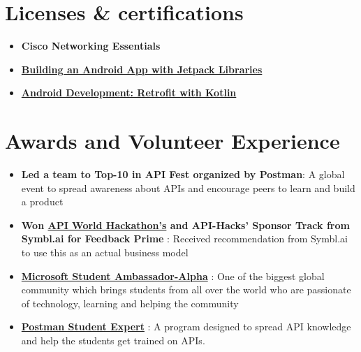 \documentclass[letterpaper,11pt]{article}
\newcommand{\resumeItem}[1]{
  \item\small{
    {#1 \vspace{-2pt}}
  }
}
\newcommand{\resumeItemListStart}{\begin{itemize}}
\newcommand{\resumeItemListEnd}{\end{itemize}\vspace{-5pt}}
\begin{document}
   
\section{Licenses \& certifications}
 \begin{itemize}[leftmargin=0.15in, label={}]
    \small{\item{
        \resumeItemListStart
                \resumeItem{\textbf{{Cisco Networking Essentials}}}
                \resumeItem{\textbf{\href{https://www.linkedin.com/learning/certificates/0678a1527860b8e6ba5694ca1c73c5bab5c3463b8bb5d6c3b9a1fcc19be38ce9}{Building an Android App with Jetpack Libraries}}}
                \resumeItem{\textbf{\href{https://www.linkedin.com/learning/certificates/0f804705fc3f345406c7a7ccdc10ec244d4384268e86e94bc5eafd52f67755d0}{Android Development: Retrofit with Kotlin}}}
      \resumeItemListEnd
    }}
 \end{itemize}
    


\section{Awards and Volunteer Experience }
 \begin{itemize}[leftmargin=0.15in, label={}]
    \small{\item{
        \resumeItemListStart
                \resumeItem{\textbf{Led a team to {Top-10 in API Fest} organized by Postman}: A global event to spread awareness about APIs and encourage peers to learn and build a product}
                \resumeItem{\textbf{{Won \href{https://devpost.com/software/feedback-prime-kbg8um}{API World Hackathon's} and {API-Hacks'} Sponsor Track from Symbl.ai for Feedback Prime} }: Received recommendation from Symbl.ai to use this as an actual business model}
                \resumeItem{\textbf{\href{https://studentambassadors.microsoft.com/en-US/profile/124303}{Microsoft Student Ambassador-Alpha}} : One of the biggest global community which brings students from all over the world who are passionate of technology, learning and helping the community }
                \resumeItem{\textbf{\href{https://api.badgr.io/public/assertions/smxpDApNQkawRdyLq88rTA}{ Postman Student Expert}} : A program designed to spread API knowledge and help the students get trained on APIs.}
      \resumeItemListEnd
    }}
 \end{itemize}
 
 
\end{document}
